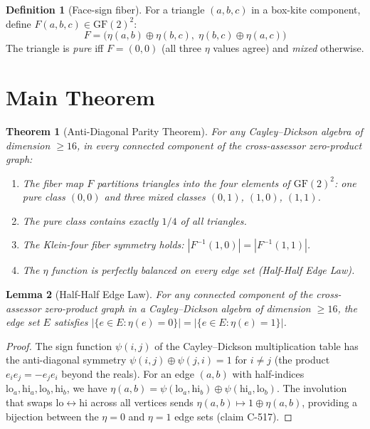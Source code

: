 \documentclass[12pt,openany]{report}
\theoremstyle{definition}
\newtheorem{definition}{Definition}[chapter]
\theoremstyle{plain}
\newtheorem{theorem}{Theorem}[chapter]
\newtheorem{lemma}[theorem]{Lemma}
\theoremstyle{remark}
\begin{document}
\begin{definition}[Face-sign fiber]
For a triangle $(a,b,c)$ in a box-kite component, define
$F(a,b,c) \in \mathrm{GF}(2)^2$:
\begin{equation}
  F = \bigl(\eta(a,b) \oplus \eta(b,c),\;
            \eta(b,c) \oplus \eta(a,c)\bigr)
  \label{eq:fiber}
\end{equation}
The triangle is \emph{pure} iff $F = (0,0)$ (all three $\eta$ values agree)
and \emph{mixed} otherwise.
\end{definition}

\section{Main Theorem}
\label{sec:apt-main}

\begin{theorem}[Anti-Diagonal Parity Theorem]
\label{thm:apt}
For any Cayley--Dickson algebra of dimension $\geq 16$, in every connected
component of the cross-assessor zero-product graph:
\begin{enumerate}
  \item The fiber map $F$ partitions triangles into the four elements of
    $\mathrm{GF}(2)^2$: one pure class $(0,0)$ and three mixed classes
    $(0,1)$, $(1,0)$, $(1,1)$.
  \item The pure class contains exactly $1/4$ of all triangles.
  \item The Klein-four fiber symmetry holds: $|F^{-1}(1,0)| = |F^{-1}(1,1)|$.
  \item The $\eta$ function is perfectly balanced on every edge set
    (Half-Half Edge Law).
\end{enumerate}
\end{theorem}

\begin{lemma}[Half-Half Edge Law]
\label{lem:half-half}
For any connected component of the cross-assessor zero-product graph in a
Cayley--Dickson algebra of dimension $\geq 16$, the edge set $E$ satisfies
$|\{e \in E : \eta(e) = 0\}| = |\{e \in E : \eta(e) = 1\}|$.
\end{lemma}

\begin{proof}
The sign function $\psi(i,j)$ of the Cayley--Dickson multiplication table
has the anti-diagonal symmetry $\psi(i,j) \oplus \psi(j,i) = 1$ for
$i \neq j$ (the product $e_i e_j = -e_j e_i$ beyond the reals).  For an
edge $(a,b)$ with half-indices $\mathrm{lo}_a, \mathrm{hi}_a, \mathrm{lo}_b,
\mathrm{hi}_b$, we have
$\eta(a,b) = \psi(\mathrm{lo}_a, \mathrm{hi}_b) \oplus
\psi(\mathrm{hi}_a, \mathrm{lo}_b)$.
The involution that swaps $\mathrm{lo} \leftrightarrow \mathrm{hi}$ across
all vertices sends $\eta(a,b) \mapsto 1 \oplus \eta(a,b)$, providing a
bijection between the $\eta = 0$ and $\eta = 1$ edge sets (claim C-517).
\end{proof}
\end{document}
